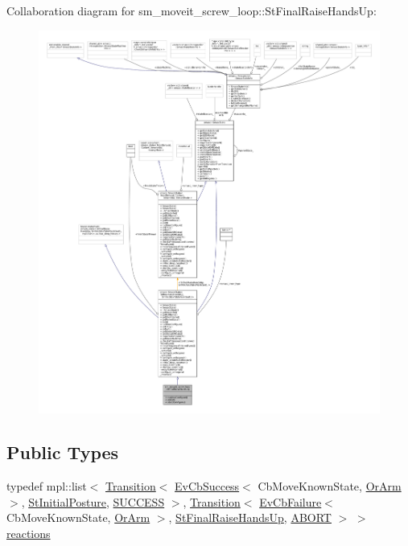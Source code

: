 Collaboration diagram for sm\+\_\+moveit\+\_\+screw\+\_\+loop\+:\+:St\+Final\+Raise\+Hands\+Up\+:
\nopagebreak
\begin{figure}[H]
\begin{center}
\leavevmode
\includegraphics[width=350pt]{structsm__moveit__screw__loop_1_1StFinalRaiseHandsUp__coll__graph}
\end{center}
\end{figure}
\subsection*{Public Types}
\begin{DoxyCompactItemize}
\item 
typedef mpl\+::list$<$ \hyperlink{classsmacc_1_1Transition}{Transition}$<$ \hyperlink{structsmacc_1_1EvCbSuccess}{Ev\+Cb\+Success}$<$ Cb\+Move\+Known\+State, \hyperlink{classsm__moveit__screw__loop_1_1OrArm}{Or\+Arm} $>$, \hyperlink{structsm__moveit__screw__loop_1_1StInitialPosture}{St\+Initial\+Posture}, \hyperlink{structsmacc_1_1default__transition__tags_1_1SUCCESS}{S\+U\+C\+C\+E\+SS} $>$, \hyperlink{classsmacc_1_1Transition}{Transition}$<$ \hyperlink{structsmacc_1_1EvCbFailure}{Ev\+Cb\+Failure}$<$ Cb\+Move\+Known\+State, \hyperlink{classsm__moveit__screw__loop_1_1OrArm}{Or\+Arm} $>$, \hyperlink{structsm__moveit__screw__loop_1_1StFinalRaiseHandsUp}{St\+Final\+Raise\+Hands\+Up}, \hyperlink{structsmacc_1_1default__transition__tags_1_1ABORT}{A\+B\+O\+RT} $>$ $>$ \hyperlink{structsm__moveit__screw__loop_1_1StFinalRaiseHandsUp_a87eec609dc99aa047838394a64e4651b}{reactions}
\end{DoxyCompactItemize}
